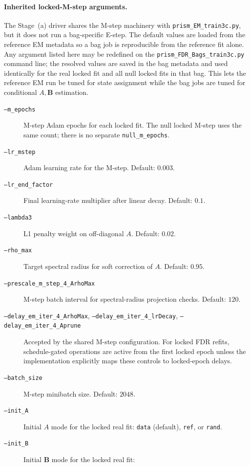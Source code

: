 \documentclass[11pt]{article}
\begin{document}
\paragraph{Inherited locked-M-step arguments.}
The Stage~(a) driver shares the M-step machinery with
\texttt{prism\_EM\_train3c.py}, but it does not run a bag-specific E-step.
The default values are loaded from the reference EM metadata so a bag job is
reproducible from the reference fit alone. Any argument listed here may be
redefined on the \texttt{prism\_FDR\_Bags\_train3c.py} command line; the
resolved values are saved in the bag metadata and used identically for the
real locked fit and all null locked fits in that bag. This lets the
reference EM run be tuned for state assignment while the bag jobs are tuned
for conditional \(A,\mathbf B\) estimation.
\begin{description}
  \item[\texttt{--m\_epochs}] M-step Adam epochs for each locked fit. The
  null locked M-step uses the same count; there is no separate
  \texttt{null\_m\_epochs}.
  \item[\texttt{--lr\_mstep}] Adam learning rate for the M-step. Default:
  \(0.003\).
  \item[\texttt{--lr\_end\_factor}] Final learning-rate multiplier after
  linear decay. Default: \(0.1\).
  \item[\texttt{--lambda3}] L1 penalty weight on off-diagonal \(A\). Default:
  \(0.02\).
  \item[\texttt{--rho\_max}] Target spectral radius for soft correction of
  \(A\). Default: \(0.95\).
  \item[\texttt{--prescale\_m\_step\_4\_ArhoMax}] M-step batch interval for
  spectral-radius projection checks. Default: \(120\).
  \item[\texttt{--delay\_em\_iter\_4\_ArhoMax},
  \texttt{--delay\_em\_iter\_4\_lrDecay},
  \texttt{--delay\_em\_iter\_4\_Aprune}] Accepted by the shared M-step
  configuration. For locked FDR refits, schedule-gated operations are active
  from the first locked epoch unless the implementation explicitly maps
  these controls to locked-epoch delays.
  \item[\texttt{--batch\_size}] M-step minibatch size. Default: \(2048\).
  \item[\texttt{--init\_A}] Initial \(A\) mode for the locked real fit:
  \texttt{data} (default), \texttt{ref}, or \texttt{rand}.
  \item[\texttt{--init\_B}] Initial \(\mathbf B\) mode for the locked real fit:

\end{description}
\end{document}
